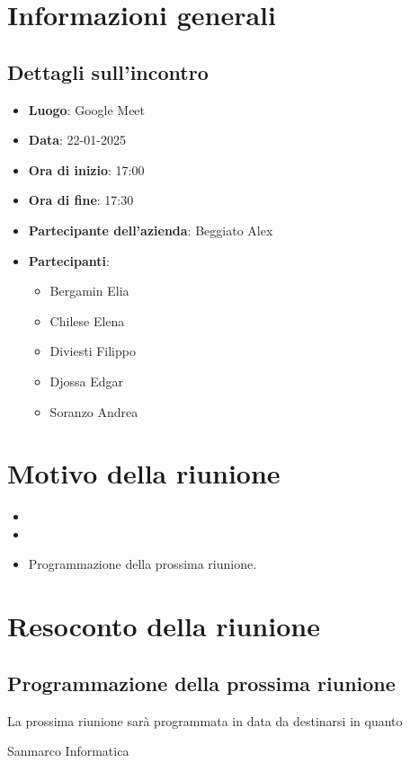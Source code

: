 \section{Informazioni generali}
\subsection{Dettagli sull'incontro}
\begin{itemize}
    \item \textbf{Luogo}: Google Meet
    \item \textbf{Data}: 22-01-2025
    \item \textbf{Ora di inizio}: 17:00
    \item \textbf{Ora di fine}: 17:30
    \item \textbf{Partecipante dell'azienda}: Beggiato Alex
    \item \textbf{Partecipanti}:
    \begin{itemize}
        \item Bergamin Elia
        \item Chilese Elena
        \item Diviesti Filippo
        \item Djossa Edgar
        \item Soranzo Andrea  
    \end{itemize}
\end{itemize}

\section{Motivo della riunione}
\begin{itemize}
    \item 
    \item 
    \item Programmazione della prossima riunione.
\end{itemize}

\section{Resoconto della riunione}
\subsection{}

\subsection{}

\subsection{Programmazione della prossima riunione}
La prossima riunione sarà programmata in data da destinarsi in quanto 


\hfill\signature{Approvazione esterna}{Sanmarco Informatica}
